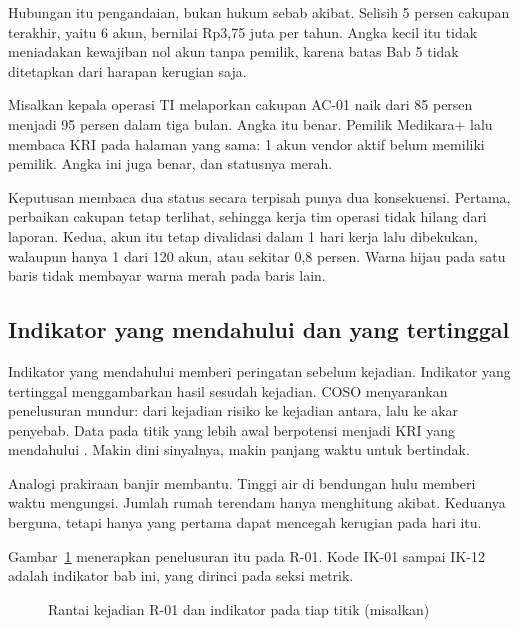 Hubungan itu pengandaian, bukan hukum sebab akibat. Selisih 5 persen cakupan terakhir, yaitu 6
akun, bernilai Rp3,75 juta per tahun. Angka kecil itu tidak meniadakan kewajiban nol akun tanpa
pemilik, karena batas Bab 5 tidak ditetapkan dari harapan kerugian saja.

\begin{kasus}[title={Kasus Medikara Health: Indikator Hijau, Risiko Merah}]
Misalkan kepala operasi TI melaporkan cakupan AC-01 naik dari 85 persen menjadi 95 persen dalam
tiga bulan. Angka itu benar. Pemilik Medikara+ lalu membaca KRI pada halaman yang sama: 1 akun
vendor aktif belum memiliki pemilik. Angka ini juga benar, dan statusnya merah.

Keputusan membaca dua status secara terpisah punya dua konsekuensi. Pertama, perbaikan cakupan
tetap terlihat, sehingga kerja tim operasi tidak hilang dari laporan. Kedua, akun itu tetap
divalidasi dalam 1 hari kerja lalu dibekukan, walaupun hanya 1 dari 120 akun, atau sekitar 0,8
persen. Warna hijau pada satu baris tidak membayar warna merah pada baris lain.
\end{kasus}

\subsection*{Indikator yang mendahului dan yang tertinggal}

Indikator yang mendahului memberi peringatan sebelum kejadian. Indikator yang tertinggal
menggambarkan hasil sesudah kejadian. COSO menyarankan penelusuran mundur: dari kejadian risiko ke
kejadian antara, lalu ke akar penyebab. Data pada titik yang lebih awal berpotensi menjadi KRI yang
mendahului \cite{c13-coso-kri}. Makin dini sinyalnya, makin panjang waktu untuk bertindak.

Analogi prakiraan banjir membantu. Tinggi air di bendungan hulu memberi waktu mengungsi. Jumlah
rumah terendam hanya menghitung akibat. Keduanya berguna, tetapi hanya yang pertama dapat mencegah
kerugian pada hari itu.

Gambar~\ref{fig:ch13-rantai} menerapkan penelusuran itu pada R-01. Kode IK-01 sampai IK-12 adalah
indikator bab ini, yang dirinci pada seksi metrik.

\begin{figure}[!htb]
  \centering
  
  \caption{Rantai kejadian R-01 dan indikator pada tiap titik (misalkan)}
  \label{fig:ch13-rantai}
\end{figure}

